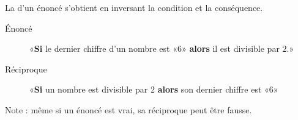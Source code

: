 \begin{definition}
    La  d'un énoncé s'obtient en inversant la condition et la conséquence.
\end{definition}

\begin{example}
    \begin{description}
        \item[Énoncé] «{\bf Si} le dernier chiffre d'un nombre est «\( 6\)» {\bf alors} il est divisible par \( 2\).» 
        \item[Réciproque] «{\bf Si} un nombre est divisible par \( 2\) {\bf alors} son dernier chiffre est «\( 6\)» 
    \end{description}
    Note : même si un énoncé est vrai, sa réciproque peut être fausse.
\end{example}
